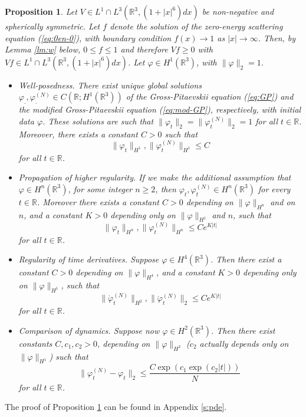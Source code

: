 \documentclass[11pt,a4paper]{article}
\newtheorem{proposition}[thm]{Proposition}
\newcommand{\bR}{{\mathbb R}}
\begin{document}
\begin{proposition} \label{t:pdes}
Let $V \in L^1 \cap L^3 (\bR^3, (1+|x|^6) dx)$ be non-negative and spherically symmetric. Let $f$ denote the solution of the zero-energy scattering equation (\ref{eq:0en-0}), with boundary condition $f(x) \to 1$ as $|x| \to \infty$. Then, by Lemma \ref{lm:w} below, $0 \leq f \leq 1$ and therefore $Vf \geq 0$ with $Vf \in L^1 \cap L^3 (\bR^3, (1+|x|^6) dx)$. Let $\varphi \in H^1 (\bR^3)$, with 
$\| \varphi \|_2 = 1$.
\begin{itemize}
\item[(i)] Well-posedness. There exist unique global solutions $\varphi_. , \varphi_.^{(N)} \in C(\bR ; H^1 (\bR^3))$ of the Gross-Pitaevskii equation (\ref{eq:GP}) and the modified Gross-Pitaevskii equation (\ref{eq:mod-GP}), respectively, with initial data $\varphi$. These solutions are such that $\| \varphi_t \|_2 = \| \varphi_t^{(N)} \|_2 = 1$ for all $t \in \bR$. Moreover, there exists a constant $C > 0$ such that
\[  \| \varphi_t \|_{H^1} , \| \varphi_t^{(N)} \|_{H^1} \leq C \]
for all $t \in \bR$. 
\item[(ii)] Propagation of higher regularity. If we make the additional assumption that $\varphi \in H^n (\bR^3)$, for some integer $n \geq 2$, then $\varphi_t , \varphi_t^{(N)} \in H^n (\bR^3)$ for every $t \in \bR$. Moreover there exists a constant $C>0$ depending on $\| \varphi \|_{H^n}$ and on $n$, and a constant $K >0$ depending only on $\| \varphi \|_{H^1}$ and $n$, such that
\begin{equation}\label{eq:hireg} \| \varphi_t \|_{H^n} , \| \varphi_t^{(N)} \|_{H^n} \leq C e^{K |t|} \end{equation}
for all $t \in \bR$. 
\item[(iii)] Regularity of time derivatives. Suppose $\varphi \in H^4 (\bR^3)$. Then there exist a constant $C>0$ depending on $\| \varphi \|_{H^4}$, and a constant $K > 0$ depending only on $\| \varphi \|_{H^1}$, such that
\[   \|\dot{\varphi}_t^{(N)} \|_{H^2} , \| \ddot{\varphi}_t^{(N)} \|_2 \leq C e^{K |t|} \]
for all $t \in \bR$.
\item[(iv)] Comparison of dynamics. Suppose now $\varphi \in H^2 (\bR^3)$. Then there exist constants $C,c_1,c_2 > 0$, depending on $\| \varphi \|_{H^2}$ ($c_2$ actually depends only on $\| \varphi \|_{H^1}$) such that 
\[ \| \varphi_t^{(N)} - \varphi_t \|_2 \leq \frac{C \exp (c_1 \exp (c_2 |t|))}{N} \,  \]
for all $t \in \bR$.
\end{itemize}
\end{proposition} 
The proof of Proposition \ref{t:pdes} can be found in Appendix \ref{s:pde}. 
\end{document}
